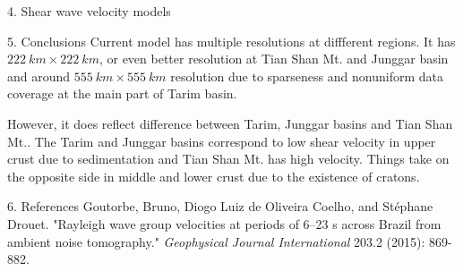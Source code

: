 \documentclass[
    landscape,      %
    paperwidth = 1200mm,
    paperheight = 900mm,
    fontscale = 0.4,
    margin = 1.7cm,
]{baposter}
\begin{document}
\begin{poster}
\begin{posterbox}[column=2 ]{4. Shear wave velocity models}
\end{posterbox}

\begin{posterbox}[column=2, below=auto]{5. Conclusions}
Current model has multiple resolutions at diffferent regions. It has
$222 \ \textit{km} \times 222 \ \textit{km}$, or even better resolution at
Tian Shan Mt. and Junggar basin and around $555 \ \textit{km} \times 555 \ \textit{km}$ resolution
due to sparseness and nonuniform data coverage at the main part of Tarim basin.

However, it does reflect difference between Tarim, Junggar basins and Tian Shan Mt..
The Tarim and Junggar basins correspond to low shear velocity in upper crust due to sedimentation and
Tian Shan Mt. has high velocity. Things take on the opposite side in middle and lower crust due to the
existence of cratons.
\end{posterbox}

\begin{posterbox}[column=2, below=auto]{6. References}
Goutorbe, Bruno, Diogo Luiz de Oliveira Coelho, and Stéphane Drouet. "Rayleigh wave group velocities at periods of 6–23 s across Brazil from ambient noise tomography." {\itshape Geophysical Journal International} 203.2 (2015): 869-882.
\end{posterbox}

\end{poster}
\end{document}
